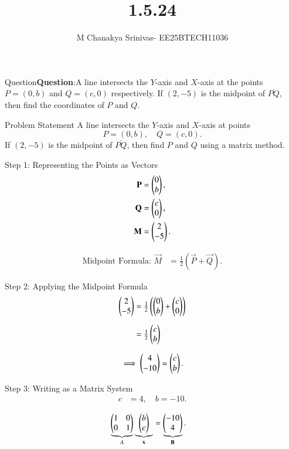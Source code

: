 \documentclass{beamer}
\title %
{1.5.24}
\date{}
\author %
{M Chanakya Srinivas- EE25BTECH11036}
\begin{document}
	
		\frame{\titlepage}
	\begin{frame}{Question}\textbf{Question}:A line intersects the $Y$-axis and $X$-axis at the points
$P=(0,b)$ and $Q=(c,0)$ respectively. If $(2,-5)$ is the midpoint of
$\overline{PQ}$, then find the coordinates of $P$ and $Q$.
\end{frame}

\begin{frame}{Problem Statement}
A line intersects the $Y$-axis and $X$-axis at points 
\[
P = (0,b), \quad Q = (c,0).
\]
If $(2,-5)$ is the midpoint of $\overline{PQ}$, then find $P$ and $Q$ using a matrix method.
\end{frame}


\begin{frame}{Step 1: Representing the Points as Vectors}
\begin{align*}
\mathbf{P} &= \begin{pmatrix}0 \\ b\end{pmatrix}, \\
\mathbf{Q} &= \begin{pmatrix}c \\ 0\end{pmatrix}, \\
\mathbf{M} &= \begin{pmatrix}2 \\ -5\end{pmatrix}.
\end{align*}

\begin{align*}
\text{Midpoint Formula: } 
\vec{M} &= \tfrac{1}{2}(\vec{P} + \vec{Q}).
\end{align*}
\end{frame}


\begin{frame}{Step 2: Applying the Midpoint Formula}
\begin{align*}
\begin{pmatrix}2 \\ -5\end{pmatrix} &= \tfrac{1}{2}\left(\begin{pmatrix}0 \\ b\end{pmatrix} + \begin{pmatrix}c \\ 0\end{pmatrix}\right) \\[6pt]
&= \tfrac{1}{2}\begin{pmatrix}c \\ b\end{pmatrix}
\end{align*}

\begin{align*}
\implies \begin{pmatrix}4 \\ -10\end{pmatrix} = \begin{pmatrix}c \\ b\end{pmatrix}.
\end{align*}
\end{frame}


\begin{frame}{Step 3: Writing as a Matrix System}
\begin{align*}
c &= 4, \quad b = -10.
\end{align*}

\begin{align*}
\underbrace{\begin{pmatrix}1 & 0 \\ 0 & 1\end{pmatrix}}_{A}
\underbrace{\begin{pmatrix}b \\ c\end{pmatrix}}_{\mathbf{x}}
&=
\underbrace{\begin{pmatrix}-10 \\ 4\end{pmatrix}}_{\mathbf{B}}.
\end{align*}
\end{frame}
\end{document}
